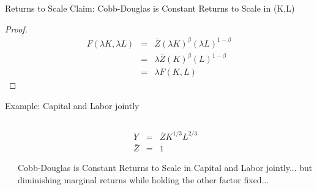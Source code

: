 \documentclass[notes,11pt, aspectratio=169, xcolor=table]{beamer}
\begin{document}
\begin{frame}{Returns to Scale}
  \Large Claim: Cobb-Douglas is Constant Returns to Scale in (K,L)  \vspace{20pt}
 
  \begin{proof}
  \begin{eqnarray*}
    F( \lambda K,\lambda L) &=& \bar{Z} (\lambda K)^\beta (\lambda L)^{1-\beta}  \\
    &=& \lambda \bar{Z}  (K)^\beta (L)^{1-\beta} \\
    &=& \lambda F( K,L)
  \end{eqnarray*}
  \end{proof}
 
\end{frame}

\begin{frame}{Example: Capital and Labor jointly}

\begin{columns}[T] %
\begin{column}{.8\textwidth}
\end{column}%
\hfill%
\begin{column}{.2\textwidth}
\begin{eqnarray*}
    Y &=& \bar{Z} K^{1/3} L^{2/3} \\
    \bar{Z} &=& 1
\end{eqnarray*}

Cobb-Douglas is Constant Returns to Scale in Capital and Labor jointly... but diminishing marginal returns while holding the other factor fixed...
\end{column}%
\end{columns}


\end{frame}
\end{document}
